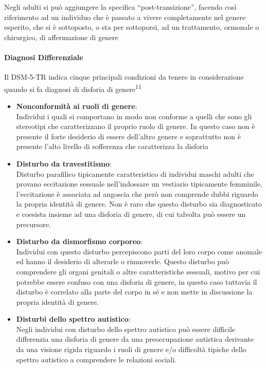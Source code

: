 \documentclass[12pt]{article}
\makeatletter
\newcommand{\cslcitation}[2]
 {\protect\hyper@linkstart{cite}{citeproc_bib_item_#1}#2\hyper@linkend}
\makeatother
\begin{document}
Negli adulti si può aggiungere la specifica ``post-transizione'', facendo così riferimento ad un individuo che è passato a vivere completamente nel genere esperito, che si è sottoposto, o sta per sottoporsi, ad un trattamento, ormonale o chirurgico, di affermazione di genere
\paragraph{Diagnosi Differenziale}
\label{sec:orgd091782}
Il DSM-5-TR indica cinque principali condizioni da tenere in considerazione quando si fa diagnosi di disforia di genere\textsuperscript{\cslcitation{11}{11}}

\begin{itemize}
\item \textbf{Nonconformità ai ruoli di genere}: \\
Individui i quali si comportano in modo non conforme a quelli che sono gli stereotipi che caratterizzano il proprio ruolo di genere. In questo caso non è presente il forte desiderio di essere dell'altro genere e soprattutto non è presente l'alto livello di sofferenza che caratterizza la disforia

\item \textbf{Disturbo da travestitismo}: \\
Disturbo parafilico tipicamente caratteristico di individui maschi adulti che provano eccitazione sessuale nell'indossare un vestiario tipicamente femminile, l'eccitazione è associata ad angoscia che però non comprende dubbi riguardo la propria identità di genere.
Non è raro che questo disturbo sia diagnosticato e coesista insieme ad una disforia di genere, di cui talvolta può essere un precursore.

\item \textbf{Disturbo da dismorfismo corporeo}: \\
Individui con questo disturbo percepiscono parti del loro corpo come anomale ed hanno il desiderio di alterarle o rimuoverle.
Questo disturbo può comprendere gli organi genitali o altre caratteristiche sessuali, motivo per cui potrebbe essere confuso con una disforia di genere, in questo caso tuttavia il disturbo è correlato alla parte del corpo in sé e non mette in discussione la propria identità di genere.
\end{itemize}


\begin{itemize}
\item \textbf{Disturbi dello spettro autistico}: \\
Negli individui con disturbo dello spettro autistico può essere difficile differenzia una disforia di genere da una preoccupazione autistica derivante da una visione rigida riguardo i ruoli di genere e/o difficoltà tipiche dello spettro autistico a comprendere le relazioni sociali.
\end{itemize}
\end{document}
